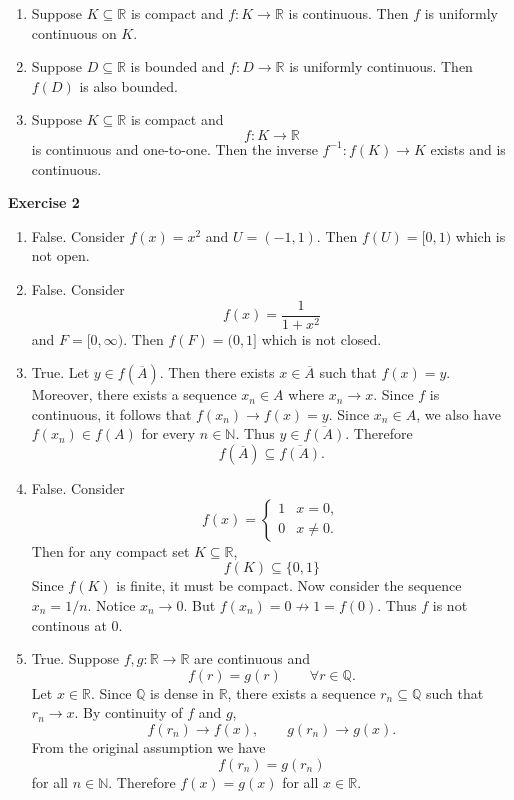 \documentclass[12pt]{article}
\begin{document}
\begin{enumerate}[label=(\alph*)]
    \item Suppose \(K\subseteq\mathbb R\) is compact and \(f:K\to\mathbb R\) is continuous. Then \(f\) is uniformly continuous on \(K\).

    \item Suppose \(D\subseteq\mathbb R\) is bounded and \(f:D\to\mathbb R\) is uniformly continuous. Then \(f(D)\) is also bounded.

    \item Suppose \(K\subseteq\mathbb R\) is compact and
          \[
              f:K\to\mathbb R
          \]
          is continuous and one-to-one. Then the inverse \(f^{-1}: f(K) \to K\) exists and is continuous.
\end{enumerate}

\textbf{Exercise 2}
\begin{enumerate}[label=(\alph*)]
    \item False. Consider \(f(x) = x^2\) and \(U = (-1,1)\). Then \(f(U) = [0, 1)\) which is not open.

    \item False. Consider
          \[
              f(x) = \frac{1}{1+x^2}
          \]
          and \(F = [0, \infty)\). Then \(f(F) = (0,1] \) which is not closed.

    \item True. Let \(y \in f(\overline{A})\). Then there exists \(x \in \overline{A} \) such that \(f(x) = y\). Moreover, there exists a sequence \(x_n \in A \) where \(x_n \to x\). Since \(f\) is continuous, it follows that \(f(x_n) \to f(x) = y\). Since \(x_n \in A\), we also have \(f(x_n) \in f(A)\) for every \(n \in \mathbb{N}\). Thus \(y \in \overline{f(A)}\). Therefore
          \[
              f(\overline{A}) \subseteq \overline{f(A)}.
          \]

    \item False. Consider
          \[
              f(x)=
              \begin{cases}
                  1 & x=0,    \\
                  0 & x\neq0.
              \end{cases}
          \]
          Then for any compact set \(K \subseteq \mathbb{R}\),
          \[
              f(K) \subseteq \{0,1\}
          \]
          Since \(f(K)\) is finite, it must be compact. Now consider the sequence \(x_n = 1/n\).
          Notice \(x_n \to 0\). But \(f(x_n) = 0 \not \to 1 = f(0)\). Thus \(f\) is not continous at 0.

    \item True. Suppose \(f,g:\mathbb R\to\mathbb R\) are continuous and
          \[
              f(r)=g(r)\qquad\forall r\in\mathbb Q.
          \]
          Let \(x \in \mathbb{R}\). Since \(\mathbb{Q} \) is dense in \(\mathbb{R}\), there exists a sequence \(r_n \subseteq \mathbb{Q}\) such that \(r_n \to x\). By continuity of \(f\) and \(g\),
          \[
              f(r_n) \to f(x), \qquad g(r_n) \to g(x).
          \]
          From the original assumption we have
          \[
              f(r_n) = g(r_n)
          \]
          for all \(n \in \mathbb{N}\).
          Therefore \(f(x) = g(x)\) for all \(x \in \mathbb{R}\).


\end{enumerate}
\end{document}
